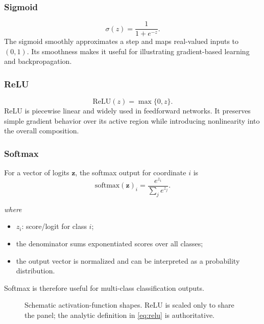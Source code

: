 \documentclass[11pt,a4paper]{report}
\newcommand{\vect}[1]{\bm{#1}}
\newcommand{\wherelegend}{\par\smallskip\textit{where}\vspace{-0.3em}}
\begin{document}
\subsubsection{Sigmoid}
\begin{equation}
  \sigma(z)=\frac{1}{1+e^{-z}}.
  \label{eq:sigmoid}
\end{equation}
The sigmoid smoothly approximates a step and maps real-valued inputs to $(0,1)$. Its smoothness makes it useful for illustrating gradient-based learning and backpropagation.

\subsubsection{ReLU}
\begin{equation}
  \mathrm{ReLU}(z)=\max\{0,z\}.
  \label{eq:relu}
\end{equation}
ReLU is piecewise linear and widely used in feedforward networks. It preserves simple gradient behavior over its active region while introducing nonlinearity into the overall composition.

\subsubsection{Softmax}
For a vector of logits $\vect{z}$, the softmax output for coordinate $i$ is
\begin{equation}
  \mathrm{softmax}(\vect{z})_i=\frac{e^{z_i}}{\sum_j e^{z_j}}.
  \label{eq:softmax}
\end{equation}
\wherelegend
\begin{itemize}
  \item $z_i$: score/logit for class $i$;
  \item the denominator sums exponentiated scores over all classes;
  \item the output vector is normalized and can be interpreted as a probability distribution.
\end{itemize}
Softmax is therefore useful for multi-class classification outputs.

\begin{figure}[H]
\centering
{}
\caption{Schematic activation-function shapes. ReLU is scaled only to share the panel; the analytic definition in \cref{eq:relu} is authoritative.}
\label{fig:activation-shapes}
\end{figure}
\end{document}
